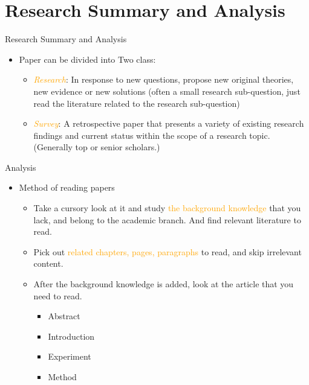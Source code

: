 \documentclass[
 size=14pt,
 paper=smartboard,  %
 mode=present, 		%
 display=slides, 	%
 style=tuliplab,  	%
 pauseslide,
 fleqn,leqno]{powerdot}{}
\begin{document}
\section{Research Summary and Analysis}

\begin{slide}[toc=,bm=]{Research Summary and Analysis}

\begin{itemize}
  \item Paper can be divided into Two class:
  \begin{itemize}
    \item  \textcolor{orange}{\textit{Research}}: In response to new questions, propose new original theories, new evidence or new solutions (often a small research sub-question, just read the literature related to the research sub-question)
    \item  \textcolor{orange}{\textit{Survey}}: A retrospective paper that presents a variety of existing research findings and current status within the scope of a research topic. (Generally top or senior scholars.)
  \end{itemize}
\end{itemize}
\end{slide}

\begin{slide}{Analysis}

\begin{itemize}
    \item Method of reading papers
    \begin{itemize}
      \item Take a cursory look at it and study \textcolor{orange}{the background knowledge} that you lack, and belong to the academic branch. And find relevant literature to read.
      \item Pick out \textcolor{orange}{related chapters, pages, paragraphs} to read, and skip irrelevant content.
      \item After the background knowledge is added, look at the article that you need to read.
      \begin{itemize}
        \item Abstract
        \item Introduction
        \item Experiment
        \item Method
      \end{itemize}
    \end{itemize}
\end{itemize}
\end{slide}
\end{document}
